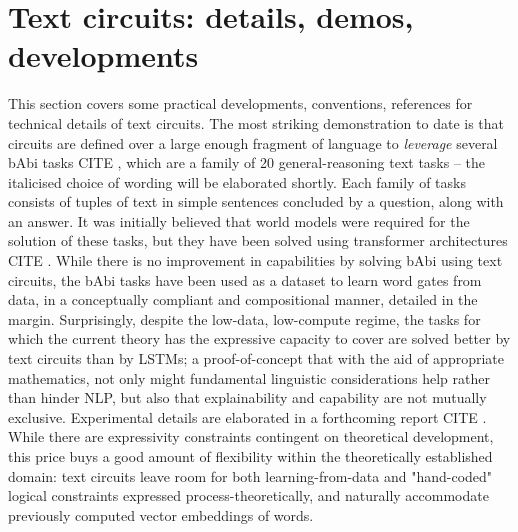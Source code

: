 \section{Text circuits: details, demos, developments}\label{sec:circs}


This section covers some practical developments, conventions, references for technical details of text circuits. The most striking demonstration to date is that circuits are defined over a large enough fragment of language to \emph{leverage} several bAbi tasks \bR CITE \e, which are a family of 20 general-reasoning text tasks -- the italicised choice of wording will be elaborated shortly. Each family of tasks consists of tuples of text in simple sentences concluded by a question, along with an answer. It was initially believed that world models were required for the solution of these tasks, but they have been solved using transformer architectures \bR CITE \e. While there is no improvement in capabilities by solving bAbi using text circuits, the bAbi tasks have been used as a dataset to learn word gates from data, in a conceptually compliant and compositional manner, detailed in the margin. Surprisingly, despite the low-data, low-compute regime, the tasks for which the current theory has the expressive capacity to cover are solved better by text circuits than by LSTMs; a proof-of-concept that with the aid of appropriate mathematics, not only might fundamental linguistic considerations help rather than hinder NLP, but also that explainability and capability are not mutually exclusive. Experimental details are elaborated in a forthcoming report \bR CITE \e. While there are expressivity constraints contingent on theoretical development, this price buys a good amount of flexibility within the theoretically established domain: text circuits leave room for both learning-from-data and "hand-coded" logical constraints expressed process-theoretically, and naturally accommodate previously computed vector embeddings of words.\\

